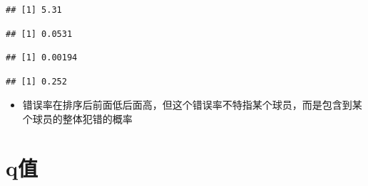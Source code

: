 \documentclass[
]{book}
\newenvironment{Shaded}{\begin{snugshade}}{\end{snugshade}}
\newcommand{\CommentTok}[1]{\textcolor[rgb]{0.56,0.35,0.01}{\textit{#1}}}
\newcommand{\DecValTok}[1]{\textcolor[rgb]{0.00,0.00,0.81}{#1}}
\newcommand{\KeywordTok}[1]{\textcolor[rgb]{0.13,0.29,0.53}{\textbf{#1}}}
\newcommand{\NormalTok}[1]{#1}
\newcommand{\OperatorTok}[1]{\textcolor[rgb]{0.81,0.36,0.00}{\textbf{#1}}}
\newcommand{\StringTok}[1]{\textcolor[rgb]{0.31,0.60,0.02}{#1}}
\providecommand{\tightlist}{%
  \setlength{\itemsep}{0pt}\setlength{\parskip}{0pt}}
\begin{document}
\begin{verbatim}
## [1] 5.31
\end{verbatim}

\begin{Shaded}
\end{Shaded}

\begin{verbatim}
## [1] 0.0531
\end{verbatim}

\begin{Shaded}
\end{Shaded}

\begin{verbatim}
## [1] 0.00194
\end{verbatim}

\begin{Shaded}
\end{Shaded}

\begin{verbatim}
## [1] 0.252
\end{verbatim}

\begin{itemize}
\tightlist
\item
  错误率在排序后前面低后面高，但这个错误率不特指某个球员，而是包含到某个球员的整体犯错的概率
\end{itemize}

\hypertarget{qux503c}{%
\section{q值}\label{qux503c}}
\end{document}
